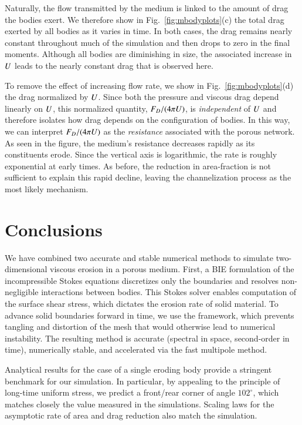 \documentclass[preprint, 10pt]{elsarticle}
\begin{document}
Naturally, the flow transmitted by the medium is linked to the amount of drag the bodies exert. We therefore show in Fig.~\ref{fig:mbodyplots}(c) the total drag exerted by all bodies as it varies in time. In both cases, the drag remains nearly constant throughout much of the simulation and then drops to zero in the final moments. Although all bodies are diminishing in size, the associated increase in $U$ leads to the nearly constant drag that is observed here.

To remove the effect of increasing flow rate, we show in Fig.~\ref{fig:mbodyplots}(d) the drag normalized by $U$. Since both the pressure and viscous drag depend linearly on $U$, this normalized quantity, $F_D / (4 \pi U)$, is {\em independent} of $U$ and therefore isolates how drag depends on the configuration of bodies. In this way, we can interpret $F_D / (4 \pi U)$ as the {\em resistance} associated with the porous network. As seen in the figure, the medium's resistance decreases rapidly as its constituents erode. Since the vertical axis is logarithmic, the rate is roughly exponential at early times. As before, the reduction in area-fraction is not sufficient to explain this rapid decline, leaving the channelization process as the most likely mechanism.


\section{Conclusions\label{s:conclusions}}

We have combined two accurate and stable numerical methods to simulate two-dimensional viscous erosion in a porous medium. First, a BIE formulation of the incompressible Stokes equations discretizes only the boundaries and resolves non-negligible interactions between bodies. This Stokes solver enables computation of the surface shear stress, which dictates the erosion rate of solid material. To advance solid boundaries forward in time, we use the {\thL} framework, which prevents tangling and distortion of the mesh that would otherwise lead to numerical instability. The resulting method is accurate (spectral in space, second-order in time), numerically stable, and accelerated via the fast multipole method.

Analytical results for the case of a single eroding body provide a stringent benchmark for our simulation. In particular, by appealing to the principle of long-time uniform stress, we predict a front/rear corner of angle $102^{\circ}$, which matches closely the value measured in the simulations. Scaling laws for the asymptotic rate of area and drag reduction also match the simulation.
\end{document}

